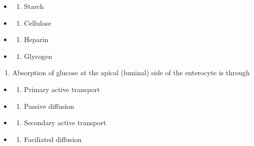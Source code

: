 \documentclass[
]{book}
\providecommand{\tightlist}{%
  \setlength{\itemsep}{0pt}\setlength{\parskip}{0pt}}
\begin{document}
\begin{itemize}
\tightlist
\item
  \begin{enumerate}
  \def\labelenumi{(\Alph{enumi})}
  \tightlist
  \item
    Starch\\
  \end{enumerate}
\item
  \begin{enumerate}
  \def\labelenumi{(\Alph{enumi})}
  \setcounter{enumi}{1}
  \tightlist
  \item
    Cellulose\\
  \end{enumerate}
\item
  \begin{enumerate}
  \def\labelenumi{(\Alph{enumi})}
  \setcounter{enumi}{2}
  \tightlist
  \item
    Heparin\\
  \end{enumerate}
\item
  \begin{enumerate}
  \def\labelenumi{(\Alph{enumi})}
  \setcounter{enumi}{3}
  \tightlist
  \item
    Glycogen
  \end{enumerate}
\end{itemize}

\begin{enumerate}
\def\labelenumi{\arabic{enumi}.}
\setcounter{enumi}{3}
\tightlist
\item
  Absorption of glucose at the apical (luminal) side of the enterocyte is through
\end{enumerate}

\begin{itemize}
\tightlist
\item
  \begin{enumerate}
  \def\labelenumi{(\Alph{enumi})}
  \tightlist
  \item
    Primary active transport\\
  \end{enumerate}
\item
  \begin{enumerate}
  \def\labelenumi{(\Alph{enumi})}
  \setcounter{enumi}{1}
  \tightlist
  \item
    Passive diffusion\\
  \end{enumerate}
\item
  \begin{enumerate}
  \def\labelenumi{(\Alph{enumi})}
  \setcounter{enumi}{2}
  \tightlist
  \item
    Secondary active transport\\
  \end{enumerate}
\item
  \begin{enumerate}
  \def\labelenumi{(\Alph{enumi})}
  \setcounter{enumi}{3}
  \tightlist
  \item
    Faciliated diffusion
  \end{enumerate}
\end{itemize}
\end{document}
